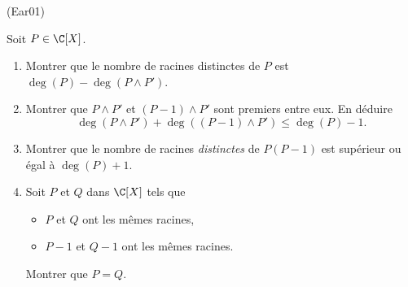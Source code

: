 \begin{tiny}(Ear01)\end{tiny} Soit $P\in \C[X]$. 
\begin{enumerate}
 \item Montrer que le nombre de racines distinctes de $P$ est $\deg(P) - \deg(P \wedge P')$.
 \item Montrer que $P \wedge P'$ et $(P-1)\wedge P'$ sont premiers entre eux. En déduire 
 \[
  \deg(P \wedge P') + \deg((P-1) \wedge P') \le \deg(P) -1 .
 \]
 \item Montrer que le nombre de racines \emph{distinctes} de $P(P-1)$ est supérieur ou égal à $\deg(P) + 1$.
 \item Soit $P$ et $Q$ dans $\C[X]$ tels que 
\begin{itemize}
 \item $P$ et $Q$ ont les mêmes racines,
 \item $P-1$ et $Q-1$ ont les mêmes racines. 
\end{itemize}
Montrer que $P=Q$.

\end{enumerate}

 